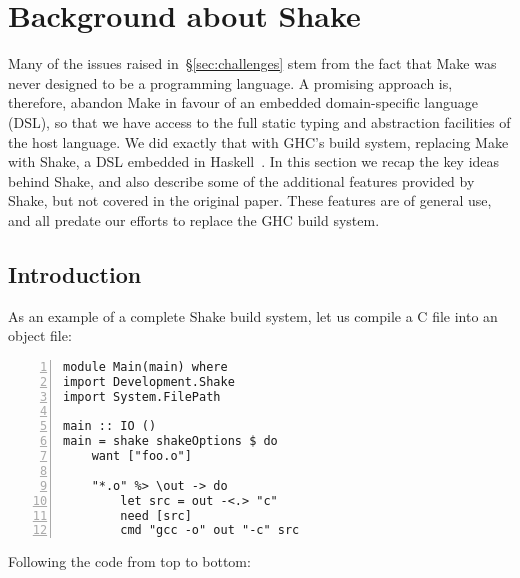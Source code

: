 \section{Background about Shake\label{sec:shake}}

Many of the issues raised in~\S\ref{sec:challenges} stem from the fact
that Make was never designed to be a programming language.  A
promising approach is, therefore, abandon Make in favour of an
embedded domain-specific language (DSL), so that we have access to the full
static typing and abstraction facilities of the host language.
We did exactly that with GHC's build system, replacing Make with
Shake, a DSL embedded in Haskell~\cite{shake}. In this section we
recap the key ideas behind Shake, and also describe some of the additional
features provided by Shake, but not covered in the original paper. These
features are of general use, and all predate our efforts to replace the GHC build
system.

\subsection{Introduction\label{sec:shake_intro}}

As an example of a complete
Shake build system, let us compile a C file into an object file:

\begin{lstlisting}[numbers=left,xleftmargin=2em,framexleftmargin=1.5em]
module Main(main) where
import Development.Shake
import System.FilePath

main :: IO ()
main = shake shakeOptions $ do
    want ["foo.o"]

    "*.o" %> \out -> do
        let src = out -<.> "c"
        need [src]
        cmd "gcc -o" out "-c" src
\end{lstlisting}

\noindent Following the code from top to bottom:

